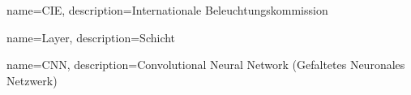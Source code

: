{
	name=CIE,
	description={Internationale Beleuchtungskommission}
}

{
	name=Layer,
	description={Schicht}
}

{
	name=CNN,
	description={Convolutional Neural Network (Gefaltetes Neuronales Netzwerk)}
}
